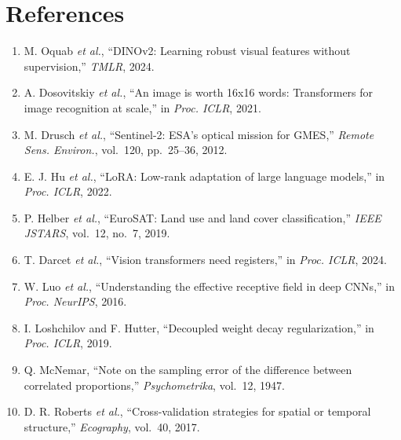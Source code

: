 \documentclass[10pt,a4paper]{article}
\begin{document}
\section*{References}
\vspace{-0.25em}
{\footnotesize
\begin{enumerate}\setlength{\itemsep}{0pt}\setlength{\parskip}{0pt}\setlength{\leftskip}{-0.6em}
\renewcommand{\labelenumi}{[\arabic{enumi}]}
\item M. Oquab \emph{et al.}, ``DINOv2: Learning robust visual features without supervision,'' \emph{TMLR}, 2024.
\item A. Dosovitskiy \emph{et al.}, ``An image is worth 16x16 words: Transformers for image recognition at scale,'' in \emph{Proc. ICLR}, 2021.
\item M. Drusch \emph{et al.}, ``Sentinel-2: ESA's optical mission for GMES,'' \emph{Remote Sens. Environ.}, vol.~120, pp.~25--36, 2012.
\item E. J. Hu \emph{et al.}, ``LoRA: Low-rank adaptation of large language models,'' in \emph{Proc. ICLR}, 2022.
\item P. Helber \emph{et al.}, ``EuroSAT: Land use and land cover classification,'' \emph{IEEE JSTARS}, vol.~12, no.~7, 2019.
\item T. Darcet \emph{et al.}, ``Vision transformers need registers,'' in \emph{Proc. ICLR}, 2024.
\item W. Luo \emph{et al.}, ``Understanding the effective receptive field in deep CNNs,'' in \emph{Proc. NeurIPS}, 2016.
\item I. Loshchilov and F. Hutter, ``Decoupled weight decay regularization,'' in \emph{Proc. ICLR}, 2019.
\item Q. McNemar, ``Note on the sampling error of the difference between correlated proportions,'' \emph{Psychometrika}, vol.~12, 1947.
\item D. R. Roberts \emph{et al.}, ``Cross-validation strategies for spatial or temporal structure,'' \emph{Ecography}, vol.~40, 2017.
\end{enumerate}}
\end{document}
